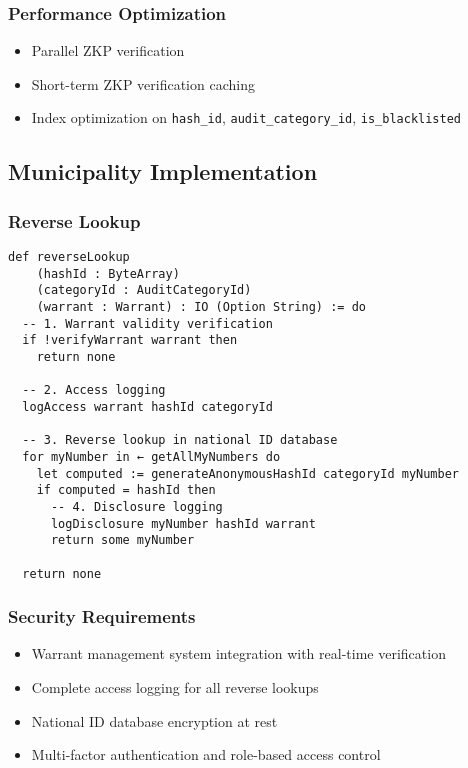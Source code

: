 \subsubsection{Performance Optimization}

\begin{itemize}
  \item Parallel ZKP verification
  \item Short-term ZKP verification caching
  \item Index optimization on \texttt{hash\_id}, \texttt{audit\_category\_id}, \texttt{is\_blacklisted}
\end{itemize}

\subsection{Municipality Implementation}

\subsubsection{Reverse Lookup}

\begin{verbatim}
def reverseLookup
    (hashId : ByteArray)
    (categoryId : AuditCategoryId)
    (warrant : Warrant) : IO (Option String) := do
  -- 1. Warrant validity verification
  if !verifyWarrant warrant then
    return none

  -- 2. Access logging
  logAccess warrant hashId categoryId

  -- 3. Reverse lookup in national ID database
  for myNumber in ← getAllMyNumbers do
    let computed := generateAnonymousHashId categoryId myNumber
    if computed = hashId then
      -- 4. Disclosure logging
      logDisclosure myNumber hashId warrant
      return some myNumber

  return none
\end{verbatim}

\subsubsection{Security Requirements}

\begin{itemize}
  \item Warrant management system integration with real-time verification
  \item Complete access logging for all reverse lookups
  \item National ID database encryption at rest
  \item Multi-factor authentication and role-based access control
\end{itemize}

